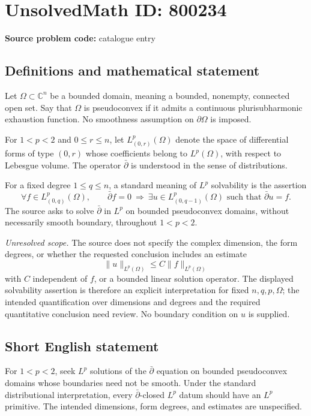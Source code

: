 \documentclass[11pt]{article}
\newcommand{\C}{\mathbb{C}}
\begin{document}
\section*{UnsolvedMath ID: 800234}
\textbf{Source problem code:} catalogue entry
\subsection{Definitions and mathematical statement}
Let \(\Omega\subset\C^n\) be a bounded domain, meaning a bounded, nonempty, connected open set. Say that \(\Omega\) is pseudoconvex if it admits a continuous plurisubharmonic exhaustion function. No smoothness assumption on \(\partial\Omega\) is imposed.

For \(1<p<2\) and \(0\le r\le n\), let \(L^p_{(0,r)}(\Omega)\) denote the space of differential forms of type \((0,r)\) whose coefficients belong to \(L^p(\Omega)\), with respect to Lebesgue volume. The operator \(\bar\partial\) is understood in the sense of distributions.

For a fixed degree \(1\le q\le n\), a standard meaning of \(L^p\) solvability is the assertion
\[
\forall f\in L^p_{(0,q)}(\Omega),\qquad
\bar\partial f=0
\ \Longrightarrow\ 
\exists u\in L^p_{(0,q-1)}(\Omega)
\text{ such that }\bar\partial u=f.
\]
The source asks to solve \(\bar\partial\) in \(L^p\) on bounded pseudoconvex domains, without necessarily smooth boundary, throughout \(1<p<2\).

\textit{Unresolved scope.} The source does not specify the complex dimension, the form degrees, or whether the requested conclusion includes an estimate
\[
\|u\|_{L^p(\Omega)}\le C\|f\|_{L^p(\Omega)}
\]
with \(C\) independent of \(f\), or a bounded linear solution operator. The displayed solvability assertion is therefore an explicit interpretation for fixed \(n,q,p,\Omega\); the intended quantification over dimensions and degrees and the required quantitative conclusion need review. No boundary condition on \(u\) is supplied.
\subsection{Short English statement}
For \(1<p<2\), seek \(L^p\) solutions of the \(\bar\partial\) equation on bounded pseudoconvex domains whose boundaries need not be smooth. Under the standard distributional interpretation, every \(\bar\partial\)-closed \(L^p\) datum should have an \(L^p\) primitive. The intended dimensions, form degrees, and estimates are unspecified.
\end{document}
